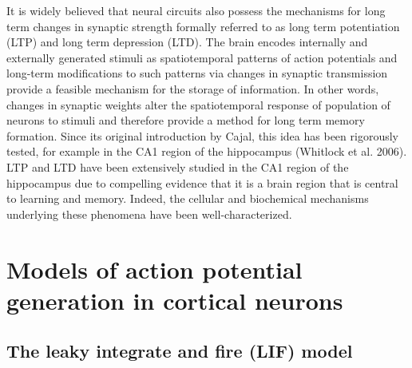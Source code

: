 \documentclass{ucetd}
\begin{document}
It is widely believed that neural circuits also possess the mechanisms for long term changes in synaptic strength formally referred to as long term potentiation (LTP) and long term depression (LTD). The brain encodes internally and externally generated stimuli as spatiotemporal patterns of action potentials and long-term modifications to such patterns via changes in synaptic transmission provide a feasible mechanism for the storage of information. In other words, changes in synaptic weights alter the spatiotemporal response of population of neurons to stimuli and therefore provide a method for long term memory formation. Since its original introduction by Cajal, this idea has been rigorously tested, for example in the CA1 region of the hippocampus (Whitlock et al. 2006). LTP and LTD have been extensively studied in the CA1 region of the hippocampus due to compelling evidence that it is a brain region that is central to learning and memory. Indeed, the cellular and biochemical mechanisms underlying these phenomena have been well-characterized. 


\section{Models of action potential generation in cortical neurons}

\subsection{The leaky integrate and fire (LIF) model}
\end{document}
